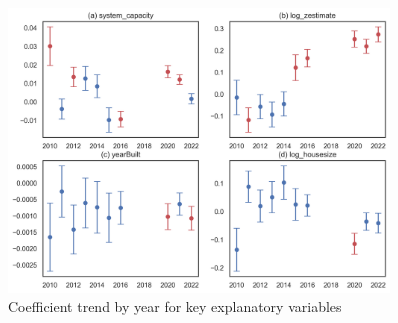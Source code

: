 \documentclass[12pt,twoside,letterpaper]{article}
\begin{document}
\begin{figure}[H]
    \centering
\includegraphics[width=0.9\textwidth]{figures/key_coefficient_trend.png}
    \caption{Coefficient trend by year for key explanatory variables}
    \label{fig:coefficient_trend}
\end{figure}




\newpage

\printbibliography
\end{document}
